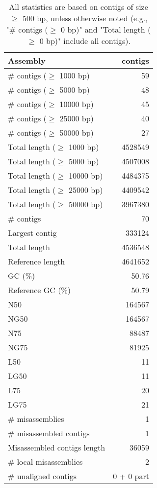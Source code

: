 \documentclass[12pt,a4paper]{article}
\begin{document}
\begin{table}[ht]
\begin{center}
\caption{All statistics are based on contigs of size $\geq$ 500 bp, unless otherwise noted (e.g., "\# contigs ($\geq$ 0 bp)" and "Total length ($\geq$ 0 bp)" include all contigs).}
\begin{tabular}{|l*{1}{|r}|}
\hline
Assembly & contigs \\ \hline
\# contigs ($\geq$ 1000 bp) & 59 \\ \hline
\# contigs ($\geq$ 5000 bp) & 48 \\ \hline
\# contigs ($\geq$ 10000 bp) & 45 \\ \hline
\# contigs ($\geq$ 25000 bp) & 40 \\ \hline
\# contigs ($\geq$ 50000 bp) & 27 \\ \hline
Total length ($\geq$ 1000 bp) & 4528549 \\ \hline
Total length ($\geq$ 5000 bp) & 4507008 \\ \hline
Total length ($\geq$ 10000 bp) & 4484375 \\ \hline
Total length ($\geq$ 25000 bp) & 4409542 \\ \hline
Total length ($\geq$ 50000 bp) & 3967380 \\ \hline
\# contigs & 70 \\ \hline
Largest contig & 333124 \\ \hline
Total length & 4536548 \\ \hline
Reference length & 4641652 \\ \hline
GC (\%) & 50.76 \\ \hline
Reference GC (\%) & 50.79 \\ \hline
N50 & 164567 \\ \hline
NG50 & 164567 \\ \hline
N75 & 88487 \\ \hline
NG75 & 81925 \\ \hline
L50 & 11 \\ \hline
LG50 & 11 \\ \hline
L75 & 20 \\ \hline
LG75 & 21 \\ \hline
\# misassemblies & 1 \\ \hline
\# misassembled contigs & 1 \\ \hline
Misassembled contigs length & 36059 \\ \hline
\# local misassemblies & 2 \\ \hline
\# unaligned contigs & 0 + 0 part \\ \hline

\end{tabular}
\end{center}
\end{table}
\end{document}
